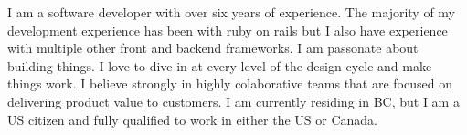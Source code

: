 %
%
%


\par{
	I am a software developer with over six years of experience. The majority of my development experience has been with ruby on rails but I also have experience with multiple other front and backend frameworks. I am passonate about building things. I love to dive in at every level  of the design cycle and make things work. I believe strongly in highly colaborative teams that are focused on delivering product value to customers. I am currently residing in BC, but I am a US citizen and fully qualified to work in either the US or Canada.
}
\\